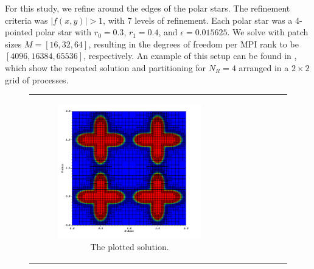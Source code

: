 For this study, we refine around the edges of the polar stars. The refinement criteria was $|f(x,y)| > 1$, with 7 levels of refinement. Each polar star was a 4-pointed polar star with $r_0 = 0.3$, $r_1 = 0.4$, and $\epsilon = 0.015625$. We solve with patch sizes $M = [16, 32, 64]$, resulting in the degrees of freedom per MPI rank to be $[4096, 16384, 65536]$, respectively. An example of this setup can be found in , which show the repeated solution and partitioning for $N_R = 4$ arranged in a $2 \times 2$ grid of processes.

\begin{figure}
    \centering
    \begin{tabular}{c c}
        \begin{subfigure}[t]{0.45\textwidth}
            \centering
            \includegraphics[width=\textwidth, clip=True, trim={0 0 0 0}]{figures/weak-scaling-stars.png}
            \caption{The plotted solution.}
            \label{subfig:polar-star-solution}
        \end{subfigure}
        &
        \begin{subfigure}[t]{0.45\textwidth}
            \centering

\end{subfigure}
\end{tabular}
\end{figure}
